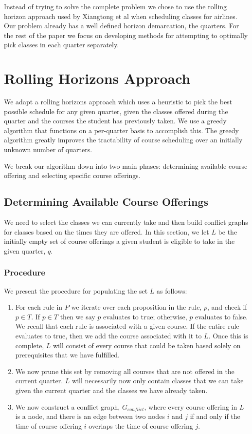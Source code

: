 \documentclass[11pt]{article} %
\begin{document}
Instead of trying to solve the complete problem we chose to use the rolling
horizon approach used by Xiangtong et al \cite{xiangton:informs} when scheduling
classes for airlines. Our problem already has a well defined horizon
demarcation, the quarters. For the rest of the paper we focus on developing
methods for attempting to optimally pick classes in each quarter separately.

\section{Rolling Horizons Approach} We adapt a rolling horizons approach which
uses a heuristic to pick the best possible schedule for any given quarter, given
the classes offered during the quarter and the courses the student has
previously taken. We use a greedy algorithm that functions on a per-quarter
basis to accomplish this. The greedy algorithm greatly improves the tractability
of course scheduling over an initially unknown number of quarters.

We break our algorithm down into two main phases: determining available course
offering and selecting specific course offerings.

\subsection{Determining Available Course Offerings} We need to select the
classes we can currently take and then build conflict graphs for classes based
on the times they are offered. In this section, we let $L$ be the initially
empty set of course offerings a given student is eligible to take in the given
quarter, $q$. \\

\subsubsection{Procedure} We present the procedure for populating the set $L$ as
follows: \begin{enumerate} \item For each rule in $P$ we iterate over each
proposition in the rule, $p$, and check if $p \in T$. If $p \in T$ then we say
$p$ evaluates to true; otherwise, $p$ evaluates to false. We recall that each
rule is associated with a given course. If the entire rule evaluates to true,
then we add the course associated with it to $L$. Once this is complete, $L$
will consist of every course that could be taken based solely on prerequisites
that we have fulfilled.  \item We now prune this set by removing all courses
that are not offered in the current quarter. $L$ will necessarily now only
contain classes that we can take given the current quarter and the classes we
have already taken.  \item We now construct a conflict graph, $G_{conflict}$,
where every course offering in $L$ is a node, and there is an edge between two
nodes $i$ and $j$ if and only if the time of course offering $i$ overlaps the
time of course offering $j$.  \end{enumerate}
\end{document}

